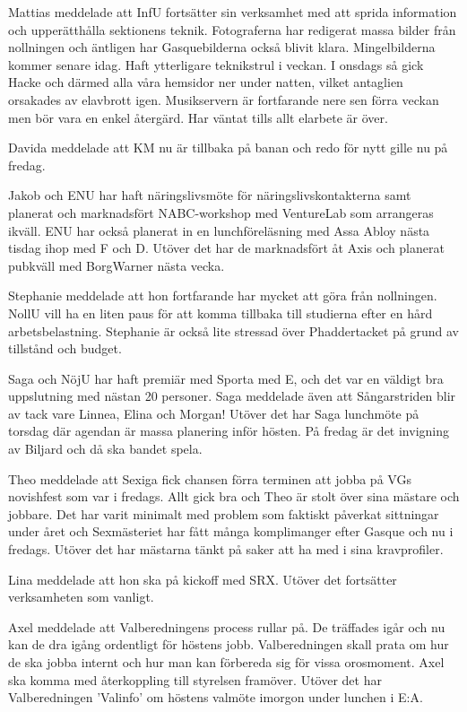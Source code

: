 \documentclass[10pt]{article}
\begin{document}
\begin{paragrafer}
\begin{paragrafer}
Mattias meddelade att InfU fortsätter sin verksamhet med att sprida information och upperätthålla sektionens teknik. 
Fotograferna har redigerat massa bilder från nollningen och äntligen har Gasquebilderna också blivit klara. Mingelbilderna kommer senare idag. 
Haft ytterligare teknikstrul i veckan. I onsdags så gick Hacke och därmed alla våra hemsidor ner under natten, vilket antaglien orsakades av elavbrott igen. Musikservern är fortfarande nere sen förra veckan men bör vara en enkel återgärd. Har väntat tills allt elarbete är över. 

Davida meddelade att KM nu är tillbaka på banan och redo för nytt gille nu på fredag.   

Jakob och ENU har haft näringslivsmöte för näringslivskontakterna samt planerat och marknadsfört NABC-workshop med VentureLab som arrangeras ikväll. ENU har också planerat in en lunchföreläsning med Assa Abloy nästa tisdag ihop med F och D. 
Utöver det har de marknadsfört åt Axis och planerat pubkväll med BorgWarner nästa vecka. 

Stephanie meddelade att hon fortfarande har mycket att göra från nollningen. NollU vill ha en liten paus för att komma tillbaka till studierna efter en hård arbetsbelastning. 
Stephanie är också lite stressad över Phaddertacket på grund av tillstånd och budget. 

Saga och NöjU har haft premiär med Sporta med E, och det var en väldigt bra uppslutning med nästan 20 personer. Saga meddelade även att Sångarstriden blir av tack vare Linnea, Elina och Morgan!
Utöver det har Saga lunchmöte på torsdag där agendan är massa planering inför hösten. På fredag är det invigning av Biljard och då ska bandet spela. 

Theo meddelade att Sexiga fick chansen förra terminen att jobba på VGs novishfest som var i fredags. Allt gick bra och Theo är stolt över sina mästare och jobbare. Det har varit minimalt med problem som faktiskt påverkat sittningar under året och Sexmästeriet har fått många komplimanger efter Gasque och nu i fredags. 
Utöver det har mästarna tänkt på saker att ha med i sina kravprofiler. 

Lina meddelade att hon ska på kickoff med SRX. Utöver det fortsätter verksamheten som vanligt. 

Axel meddelade att Valberedningens process rullar på. De träffades igår och nu kan de dra igång ordentligt för höstens jobb. 
Valberedningen skall prata om hur de ska jobba internt och hur man kan förbereda sig för vissa orosmoment. Axel ska komma med återkoppling till styrelsen framöver. 
Utöver det har Valberedningen 'Valinfo' om höstens valmöte imorgon under lunchen i E:A. 


\end{paragrafer}
\end{paragrafer}
\end{document}
